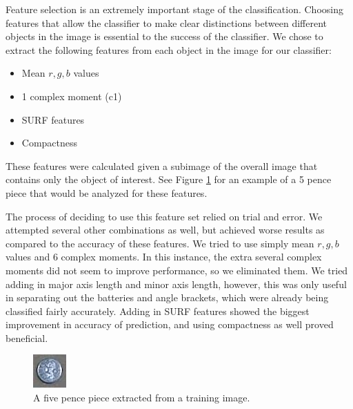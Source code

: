 \documentclass[12pt]{article}
\begin{document}
Feature selection is an extremely important stage of the classification. Choosing features that allow the classifier to make clear distinctions between different objects in the image is essential to the success of the classifier. We chose to extract the following features from each object in the image for our classifier:

\begin{itemize}
	\item Mean $r,g,b$ values
	\item 1 complex moment (c1)
	\item SURF features
	\item Compactness
\end{itemize}

These features were calculated given a subimage of the overall image that contains only the object of interest. See Figure \ref{fig:5pencesub} for an example of a 5 pence piece that would be analyzed for these features.

The process of deciding to use this feature set relied on trial and error. We attempted several other combinations as well, but achieved worse results as compared to the accuracy of these features. We tried to use simply mean $r,g,b$ values and 6 complex moments. In this instance, the extra several complex moments did not seem to improve performance, so we eliminated them. We tried adding in major axis length and minor axis length, however, this was only useful in separating out the batteries and angle brackets, which were already being classified fairly accurately. Adding in SURF features showed the biggest improvement in accuracy of prediction, and using compactness as well proved beneficial.

\begin{figure}
	\centering
	\includegraphics[width=0.5\linewidth]{subimage}
	\caption{A five pence piece extracted from a training image.}
	\label{fig:5pencesub}
\end{figure}
\end{document}
